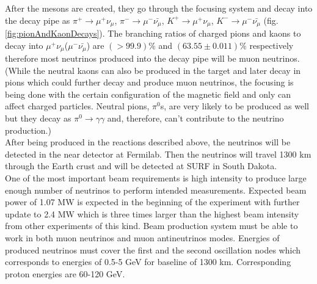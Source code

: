After the mesons are created, they go through the focusing system and decay into the decay pipe as $\pi^+ \rightarrow \mu^+\nu_\mu$, $\pi^- \rightarrow \mu^-\bar{\nu_\mu}$, $K^+ \rightarrow \mu^+\nu_\mu$, $K^- \rightarrow \mu^-\bar{\nu_\mu}$ (fig. \ref{fig:pionAndKaonDecays}). The branching ratios of charged pions and kaons to decay into $\mu^+\nu_\mu$($\mu^-\bar{\nu_\mu}$) are $(>99.9)\%$ and $(63.55\pm0.011)\%$ respectively therefore most neutrinos produced into the decay pipe will be muon neutrinos. (While the neutral kaons can also be produced in the target and later decay in pions which could further decay and produce muon neutrinos, the focusing is being done with the certain configuration of the magnetic field and only can affect charged particles. Neutral pions, $\pi^0$s, are very likely to be produced as well but they decay as $\pi^0 \rightarrow \gamma\gamma$ and, therefore, can't contribute to the neutrino production.)\\
After being produced in the reactions described above, the neutrinos will be detected in the near detector at Fermilab. Then the neutrinos will travel 1300 km through the Earth crust and will be detected at SURF in South Dakota.\\  

One of the most important beam requirements is high intensity to produce large enough number of neutrinos to perform intended measurements. Expected beam power of 1.07 MW is expected in the beginning of the experiment with further update to 2.4 MW which is three times larger than the highest beam intensity from other experiments of this kind. Beam production system must be able to work in both muon neutrinos and muon antineutrinos modes. Energies of produced neutrinos must cover the first and the second oscillation nodes which corresponds to energies of 0.5-5 GeV for baseline of 1300 km. Corresponding proton energies are 60-120 GeV.

